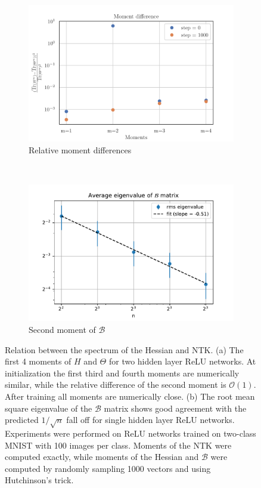 \documentclass[english]{article}
\begin{document}
 \begin{figure}
     \centering
     \begin{subfigure}[b]{0.46\textwidth}
         \centering
         \includegraphics[width=\textwidth]{new_figs/mom_diff}
         \caption{Relative moment differences}
         \label{fig:mom_diff}
     \end{subfigure}
 \ \ \ \ \ \ \ \ \ \ 
     \begin{subfigure}[b]{0.46\textwidth}
         \centering
         \includegraphics[width=\textwidth]{new_figs/Bmom}
         \caption{Second moment of $\mathcal{B}$}
         \label{fig:bmom}
     \end{subfigure}
     \caption{Relation between the spectrum of the Hessian and NTK. (a) The first 4 moments of $H$ and $\Theta$ for two hidden layer ReLU networks. At initialization the first third and fourth moments are numerically similar, while the relative difference of the second moment is $\mathcal{O}(1)$. After training all moments are numerically close. (b) The root mean square eigenvalue of the $\mathcal{B}$ matrix shows good agreement with the predicted $1/\sqrt{n}$ fall off for single hidden layer ReLU networks. Experiments were performed on ReLU networks trained on two-class MNIST with 100 images per class. Moments of the NTK were computed exactly, while moments of the Hessian and $\mathcal{B}$ were computed by randomly sampling 1000 vectors and using Hutchinson's trick.} \label{fig:moments}
 \end{figure}
\end{document}
